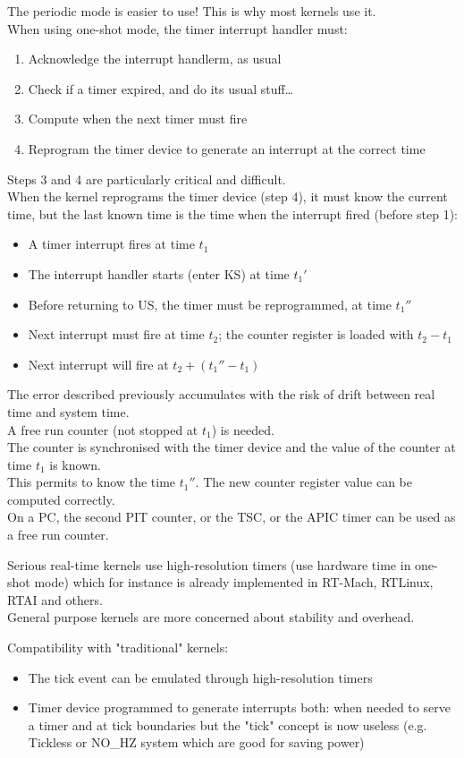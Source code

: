 The periodic mode is easier to use! This is why most kernels use it.\\
When using one-shot mode, the timer interrupt handler must:
\begin{enumerate}
    \item Acknowledge the interrupt handlerm, as usual
    \item Check if a timer expired, and do its usual stuff\dots
    \item Compute when the next timer must fire
    \item Reprogram the timer device to generate an interrupt at the correct time
\end{enumerate}
Steps 3 and 4 are particularly critical and difficult.\\
When the kernel reprograms the timer device (step 4), it must know the current time, but the last known time is the time when the interrupt fired (before step 1):
\begin{itemize}
    \item A timer interrupt fires at time $t_1$
    \item The interrupt handler starts (enter KS) at time $t_1'$
    \item Before returning to US, the timer must be reprogrammed, at time $t_1''$
    \item Next interrupt must fire at time $t_2$; the counter register is loaded with $t_2 - t_1$
    \item Next interrupt will fire at $t_2 + (t_1'' - t_1)$
\end{itemize}
The error described previously accumulates with the risk of drift between real time and system time.\\
A free run counter (not stopped at $t_1$) is needed.\\
The counter is synchronised with the timer device and the value of the counter at time $t_1$ is known.\\
This permits to know the time $t_1''$. The new counter register value can be computed correctly.\\
On a PC, the second PIT counter, or the TSC, or the APIC timer can be used as a free run counter.

Serious real-time kernels use high-resolution timers (use hardware time in one-shot mode) which for instance is already implemented in RT-Mach, RTLinux, RTAI and others.\\
General purpose kernels are more concerned about stability and overhead.

Compatibility with "traditional" kernels:
\begin{itemize}
    \item The tick event can be emulated through high-resolution timers
    \item Timer device programmed to generate interrupts both: when needed to serve a timer and at tick boundaries but the "tick" concept is now useless (e.g. Tickless or NO\_HZ system which are good for saving power)  
\end{itemize}